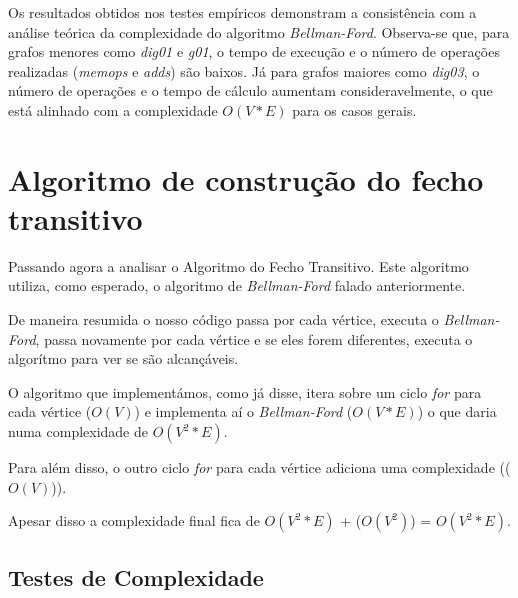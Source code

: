 \documentclass[code,math]{relatorio-deti}
\begin{document}
Os resultados obtidos nos testes empíricos demonstram a consistência com a análise teórica da complexidade do algoritmo \textit{Bellman-Ford}. Observa-se que, para grafos menores como \textit{dig01} e \textit{g01}, o tempo de execução e o número de operações realizadas (\textit{memops} e \textit{adds}) são baixos. Já para grafos maiores como \textit{dig03}, o número de operações e o tempo de cálculo aumentam consideravelmente, o que está alinhado com a complexidade $O(V*E)$ para os casos gerais.

\chapter{Algoritmo de construção do fecho transitivo}

Passando agora a analisar o Algoritmo do Fecho Transitivo.
Este algoritmo utiliza, como esperado, o algoritmo de \textit{Bellman-Ford} falado anteriormente.

De maneira resumida o nosso código passa por cada vértice, executa o \textit{Bellman-Ford}, passa novamente por cada vértice e se eles forem diferentes, executa o algorítmo para ver se são alcançáveis.

O algoritmo que implementámos, como já disse, itera sobre um ciclo \textit{for} para cada vértice ($O(V)$) e implementa aí o \textit{Bellman-Ford} ($O(V*E)$) o que daria numa complexidade de $O(V^{2}*E)$.

Para além disso, o outro ciclo \textit{for} para cada vértice adiciona uma complexidade (($O(V)$)).

Apesar disso a complexidade final fica de $O(V^{2}*E)$ + ($O(V^{2})$) = $O(V^{2}*E)$.



\section{Testes de Complexidade}
\end{document}
